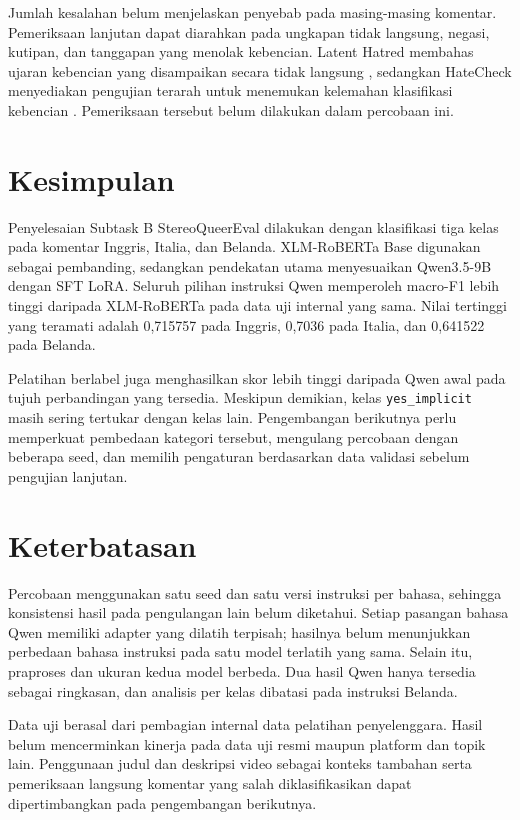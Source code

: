 \documentclass[11pt]{article}
\begin{document}
Jumlah kesalahan belum menjelaskan penyebab pada masing-masing komentar. Pemeriksaan lanjutan dapat diarahkan pada ungkapan tidak langsung, negasi, kutipan, dan tanggapan yang menolak kebencian. Latent Hatred membahas ujaran kebencian yang disampaikan secara tidak langsung \citep{elsherief-etal-2021-latent}, sedangkan HateCheck menyediakan pengujian terarah untuk menemukan kelemahan klasifikasi kebencian \citep{rottger-etal-2021-hatecheck}. Pemeriksaan tersebut belum dilakukan dalam percobaan ini.

\section{Kesimpulan}
Penyelesaian Subtask B StereoQueerEval dilakukan dengan klasifikasi tiga kelas pada komentar Inggris, Italia, dan Belanda. XLM-RoBERTa Base digunakan sebagai pembanding, sedangkan pendekatan utama menyesuaikan Qwen3.5-9B dengan SFT LoRA. Seluruh pilihan instruksi Qwen memperoleh macro-F1 lebih tinggi daripada XLM-RoBERTa pada data uji internal yang sama. Nilai tertinggi yang teramati adalah 0,715757 pada Inggris, 0,7036 pada Italia, dan 0,641522 pada Belanda.

Pelatihan berlabel juga menghasilkan skor lebih tinggi daripada Qwen awal pada tujuh perbandingan yang tersedia. Meskipun demikian, kelas \texttt{yes\_implicit} masih sering tertukar dengan kelas lain. Pengembangan berikutnya perlu memperkuat pembedaan kategori tersebut, mengulang percobaan dengan beberapa seed, dan memilih pengaturan berdasarkan data validasi sebelum pengujian lanjutan.

\section*{Keterbatasan}
Percobaan menggunakan satu seed dan satu versi instruksi per bahasa, sehingga konsistensi hasil pada pengulangan lain belum diketahui. Setiap pasangan bahasa Qwen memiliki adapter yang dilatih terpisah; hasilnya belum menunjukkan perbedaan bahasa instruksi pada satu model terlatih yang sama. Selain itu, praproses dan ukuran kedua model berbeda. Dua hasil Qwen hanya tersedia sebagai ringkasan, dan analisis per kelas dibatasi pada instruksi Belanda.

Data uji berasal dari pembagian internal data pelatihan penyelenggara. Hasil belum mencerminkan kinerja pada data uji resmi maupun platform dan topik lain. Penggunaan judul dan deskripsi video sebagai konteks tambahan serta pemeriksaan langsung komentar yang salah diklasifikasikan dapat dipertimbangkan pada pengembangan berikutnya.


\end{document}
